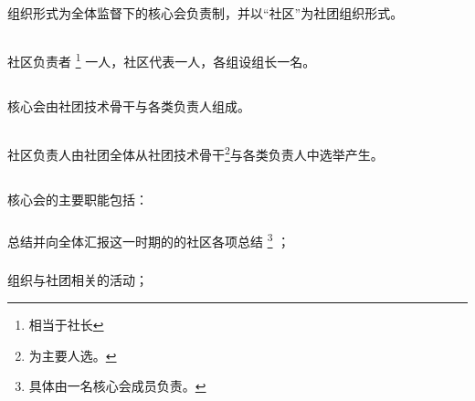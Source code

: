 \documentclass[UTF8]{ctexart}
\begin{document}
\subsection{}组织形式为全体监督下的核心会负责制，并以“社区”为社团组织形式。
\subsection{}社区负责者 \footnote{相当于社长} 一人，社区代表一人，各组设组长一名。
\subsection{}核心会由社团技术骨干与各类负责人组成。
\subsection{}社区负责人由社团全体从社团技术骨干\footnote{为主要人选。}与各类负责人中选举产生。
\subsection{}核心会的主要职能包括：
\subsubsection{}总结并向全体汇报这一时期的的社区各项总结
\footnote{具体由一名核心会成员负责。}
；
\subsubsection{}组织与社团相关的活动；
\end{document}
